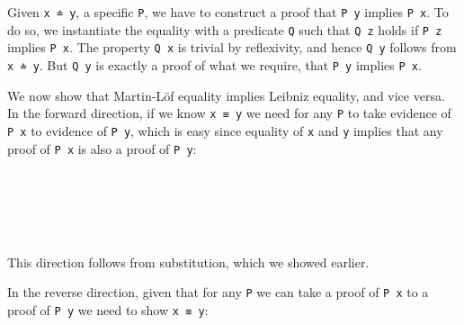 Given \texttt{x\ ≐\ y}, a specific \texttt{P}, we have to construct a
proof that \texttt{P\ y} implies \texttt{P\ x}. To do so, we instantiate
the equality with a predicate \texttt{Q} such that \texttt{Q\ z} holds
if \texttt{P\ z} implies \texttt{P\ x}. The property \texttt{Q\ x} is
trivial by reflexivity, and hence \texttt{Q\ y} follows from
\texttt{x\ ≐\ y}. But \texttt{Q\ y} is exactly a proof of what we
require, that \texttt{P\ y} implies \texttt{P\ x}.

We now show that Martin-Löf equality implies Leibniz equality, and vice
versa. In the forward direction, if we know \texttt{x\ ≡\ y} we need for
any \texttt{P} to take evidence of \texttt{P\ x} to evidence of
\texttt{P\ y}, which is easy since equality of \texttt{x} and \texttt{y}
implies that any proof of \texttt{P\ x} is also a proof of
\texttt{P\ y}:

\begin{fence}
\begin{code}%
\>[0]\AgdaSpace{}%
\AgdaSymbol{:}\AgdaSpace{}%
\AgdaSpace{}%
\AgdaSymbol{\{}\AgdaSpace{}%
\AgdaSymbol{:}\AgdaSpace{}%
\AgdaSymbol{\}}\AgdaSpace{}%
\AgdaSymbol{\{}\AgdaSpace{}%
\AgdaSpace{}%
\AgdaSymbol{:}\AgdaSpace{}%
\AgdaSymbol{\}}\<%
\\
\>[0][@{}l@{\AgdaIndent{0}}]%
\>[2]%
\>[636I]\AgdaSpace{}%
\AgdaSpace{}%
\<%
\\
\>[.][@{}l@{}]\<[636I]%
\>[4]\AgdaComment{-----}\<%
\\
%
\>[2]\AgdaSpace{}%
\AgdaSpace{}%
\AgdaSpace{}%
\<%
\\
\>[0]\AgdaSpace{}%
\AgdaSpace{}%
%
\>[19]\AgdaSymbol{=}%
\>[22]\AgdaSpace{}%
\AgdaSpace{}%
\<%
\end{code}
\end{fence}

This direction follows from substitution, which we showed earlier.

In the reverse direction, given that for any \texttt{P} we can take a
proof of \texttt{P\ x} to a proof of \texttt{P\ y} we need to show
\texttt{x\ ≡\ y}:

